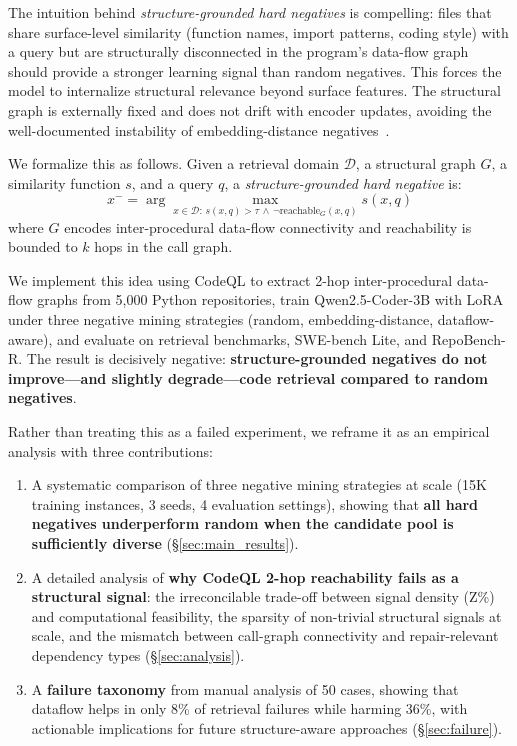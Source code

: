 \documentclass[11pt]{article}
\begin{document}
The intuition behind \emph{structure-grounded hard negatives} is compelling: files that share surface-level similarity (function names, import patterns, coding style) with a query but are structurally disconnected in the program's data-flow graph should provide a stronger learning signal than random negatives. This forces the model to internalize structural relevance beyond surface features. The structural graph is externally fixed and does not drift with encoder updates, avoiding the well-documented instability of embedding-distance negatives~\citep{robinson2021contrastive}.

We formalize this as follows. Given a retrieval domain $\mathcal{D}$, a structural graph $G$, a similarity function $s$, and a query $q$, a \emph{structure-grounded hard negative} is:
\begin{equation}
x^{-} = \arg\max_{x \in \mathcal{D}:\, s(x,q) > \tau \,\wedge\, \neg\text{reachable}_G(x,q)} s(x,q)
\end{equation}
where $G$ encodes inter-procedural data-flow connectivity and reachability is bounded to $k$ hops in the call graph.

We implement this idea using CodeQL to extract 2-hop inter-procedural data-flow graphs from 5,000 Python repositories, train Qwen2.5-Coder-3B with LoRA under three negative mining strategies (random, embedding-distance, dataflow-aware), and evaluate on retrieval benchmarks, SWE-bench Lite, and RepoBench-R. The result is decisively negative: \textbf{structure-grounded negatives do not improve---and slightly degrade---code retrieval compared to random negatives}.

Rather than treating this as a failed experiment, we reframe it as an empirical analysis with three contributions:

\begin{enumerate}[leftmargin=*,itemsep=2pt]
    \item A systematic comparison of three negative mining strategies at scale (15K training instances, 3 seeds, 4 evaluation settings), showing that \textbf{all hard negatives underperform random when the candidate pool is sufficiently diverse} (\S\ref{sec:main_results}).
    \item A detailed analysis of \textbf{why CodeQL 2-hop reachability fails as a structural signal}: the irreconcilable trade-off between signal density (Z\%) and computational feasibility, the sparsity of non-trivial structural signals at scale, and the mismatch between call-graph connectivity and repair-relevant dependency types (\S\ref{sec:analysis}).
    \item A \textbf{failure taxonomy} from manual analysis of 50 cases, showing that dataflow helps in only 8\% of retrieval failures while harming 36\%, with actionable implications for future structure-aware approaches (\S\ref{sec:failure}).
\end{enumerate}
\end{document}
